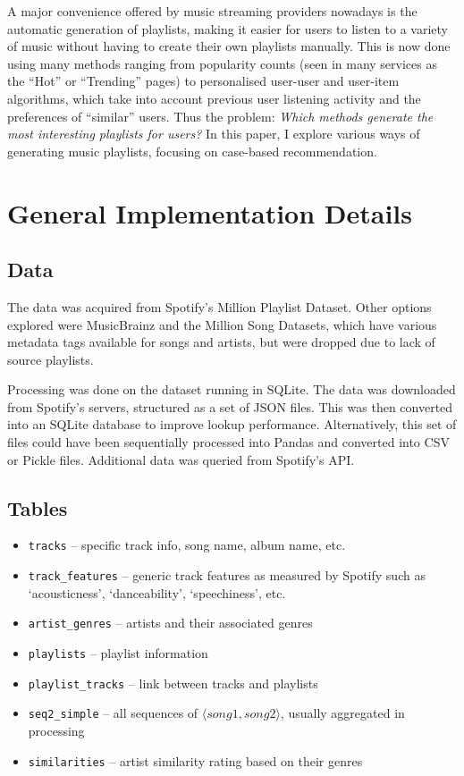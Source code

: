 \documentclass[a4paper, 12pt]{report}
\begin{document}
A major convenience offered by music streaming providers nowadays is the automatic generation of playlists,
making it easier for users to listen to a variety of music without having to create their own playlists manually.
This is now done using many methods ranging from popularity counts (seen in many services as the ``Hot'' or ``Trending'' pages) to personalised user-user and user-item algorithms,
which take into account previous user listening activity and the preferences of ``similar'' users. Thus the problem: \textit{Which
methods generate the most interesting playlists for users?} In this paper, I explore various ways of generating music playlists, focusing on case-based recommendation.




\chapter{General Implementation Details}

\section{Data}
The data was acquired from Spotify's Million Playlist Dataset. Other options explored were MusicBrainz and the Million Song Datasets,
which have various metadata tags available for songs and artists, but were dropped due to lack of source playlists.

Processing was done on the dataset running in SQLite.
The data was downloaded from Spotify's servers, structured as a set of JSON files.
This was then converted into an SQLite database to improve lookup performance.
Alternatively, this set of files could have been sequentially processed into Pandas and converted into CSV or Pickle files.
Additional data was queried from Spotify's API.

\section{Tables}
\begin{itemize}
    \item \texttt{tracks} -- specific track info, song name, album name, etc.
    \item \texttt{track\_features} -- generic track features as measured by Spotify such as `acousticness', `danceability', `speechiness', etc.
    \item \texttt{artist\_genres} -- artists and their associated genres
    \item \texttt{playlists} -- playlist information
    \item \texttt{playlist\_tracks} -- link between tracks and playlists
    \item \texttt{seq2\_simple} -- all sequences of \(\langle song1, song2 \rangle\), usually aggregated in processing
    \item \texttt{similarities} -- artist similarity rating based on their genres
\end{itemize}
\end{document}
